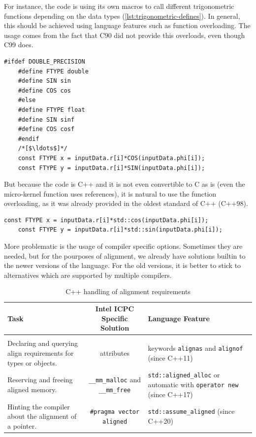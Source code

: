 \documentclass[
    12pt, %
]{fphw}
\newcommand{\tech}{\texttt}
\begin{document}
    For instance, the code is using its own macros to
call different trigonometric functions depending on the data types
(\cref{lst:trigonometric-defines}).
In general, this should be achieved using language features such as function overloading.
The usage comes from the fact that C90 did not provide this overloads,
even though C99 does.

\begin{lstlisting}[gobble=4, label=lst:trigonometric-defines]
    #ifdef DOUBLE_PRECISION
    #define FTYPE double
    #define SIN sin
    #define COS cos
    #else
    #define FTYPE float
    #define SIN sinf
    #define COS cosf
    #endif
    /*[$\ldots$]*/
    const FTYPE x = inputData.r[i]*COS(inputData.phi[i]);
    const FTYPE y = inputData.r[i]*SIN(inputData.phi[i]);

\end{lstlisting}

    But because the code is C++ and it is not even convertible to C as is
(even the micro-kernel function uses references),
it is natural to use the function overloading,
as it was already provided in the oldest standard of C++ (C++98).

\begin{lstlisting}[gobble=4]
    const FTYPE x = inputData.r[i]*std::cos(inputData.phi[i]);
    const FTYPE y = inputData.r[i]*std::sin(inputData.phi[i]);

\end{lstlisting}

    More problematic is the usage of compiler specific options.
Sometimes they are needed, but for the pourposes of alignment,
we already have solutions builtin to the newer versions of the language.
For the old versions,
it is better to stick to alternatives which are supported by multiple compilers.

\begin{table}[h]
    \centering
    \begin{tabular}{m{} c m{}}
        \textbf{Task} &
            \textbf{Intel ICPC Specific Solution} &
                \textbf{Language Feature} \\
        \hline \\

        Declaring and querying align requirements for types or objects. &
            attributes &
                keywords \tech{alignas} and \tech{alignof} (since C++11) \\[2em]
        Reserving and freeing aligned memory. &
            \tech{\_\_mm\_malloc} and \tech{\_\_mm\_free} &
                \tech{std::aligned\_alloc} or automatic with \tech{operator new}
                (since C++17) \\[2em]
        Hinting the compiler about the alignment of a pointer. &
            \tech{\#pragma vector aligned} &
                \tech{std::assume\_aligned} (since C++20) \\[2em]
    \end{tabular}
    \caption{C++ handling of alignment requirements}
\end{table}
\end{document}
